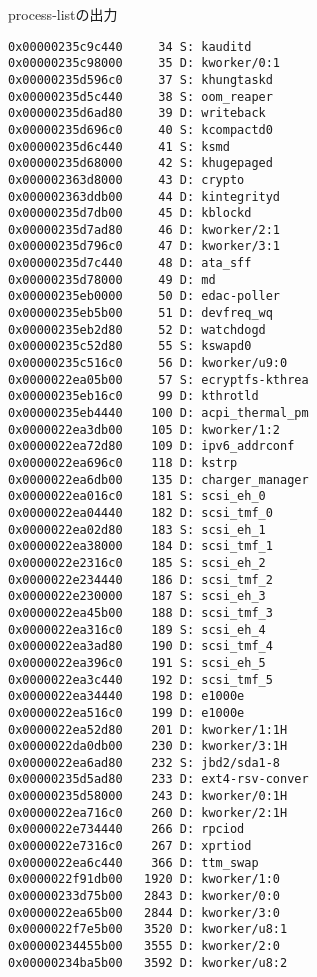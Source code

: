 \begin{itembox}[l]{process-listの出力}
\begin{verbatim}
0x00000235c9c440     34 S: kauditd
0x00000235c98000     35 D: kworker/0:1
0x00000235d596c0     37 S: khungtaskd
0x00000235d5c440     38 S: oom_reaper
0x00000235d6ad80     39 D: writeback
0x00000235d696c0     40 S: kcompactd0
0x00000235d6c440     41 S: ksmd
0x00000235d68000     42 S: khugepaged
0x000002363d8000     43 D: crypto
0x000002363ddb00     44 D: kintegrityd
0x00000235d7db00     45 D: kblockd
0x00000235d7ad80     46 D: kworker/2:1
0x00000235d796c0     47 D: kworker/3:1
0x00000235d7c440     48 D: ata_sff
0x00000235d78000     49 D: md
0x00000235eb0000     50 D: edac-poller
0x00000235eb5b00     51 D: devfreq_wq
0x00000235eb2d80     52 D: watchdogd
0x00000235c52d80     55 S: kswapd0
0x00000235c516c0     56 D: kworker/u9:0
0x0000022ea05b00     57 S: ecryptfs-kthrea
0x00000235eb16c0     99 D: kthrotld
0x00000235eb4440    100 D: acpi_thermal_pm
0x0000022ea3db00    105 D: kworker/1:2
0x0000022ea72d80    109 D: ipv6_addrconf
0x0000022ea696c0    118 D: kstrp
0x0000022ea6db00    135 D: charger_manager
0x0000022ea016c0    181 S: scsi_eh_0
0x0000022ea04440    182 D: scsi_tmf_0
0x0000022ea02d80    183 S: scsi_eh_1
0x0000022ea38000    184 D: scsi_tmf_1
0x0000022e2316c0    185 S: scsi_eh_2
0x0000022e234440    186 D: scsi_tmf_2
0x0000022e230000    187 S: scsi_eh_3
0x0000022ea45b00    188 D: scsi_tmf_3
0x0000022ea316c0    189 S: scsi_eh_4
0x0000022ea3ad80    190 D: scsi_tmf_4
0x0000022ea396c0    191 S: scsi_eh_5
0x0000022ea3c440    192 D: scsi_tmf_5
0x0000022ea34440    198 D: e1000e
0x0000022ea516c0    199 D: e1000e
0x0000022ea52d80    201 D: kworker/1:1H
0x0000022da0db00    230 D: kworker/3:1H
0x0000022ea6ad80    232 S: jbd2/sda1-8
0x00000235d5ad80    233 D: ext4-rsv-conver
0x00000235d58000    243 D: kworker/0:1H
0x0000022ea716c0    260 D: kworker/2:1H
0x0000022e734440    266 D: rpciod
0x0000022e7316c0    267 D: xprtiod
0x0000022ea6c440    366 D: ttm_swap
0x0000022f91db00   1920 D: kworker/1:0
0x00000233d75b00   2843 D: kworker/0:0
0x0000022ea65b00   2844 D: kworker/3:0
0x0000022f7e5b00   3520 D: kworker/u8:1
0x00000234455b00   3555 D: kworker/2:0
0x00000234ba5b00   3592 D: kworker/u8:2
    \end{verbatim}
\end{itembox}

